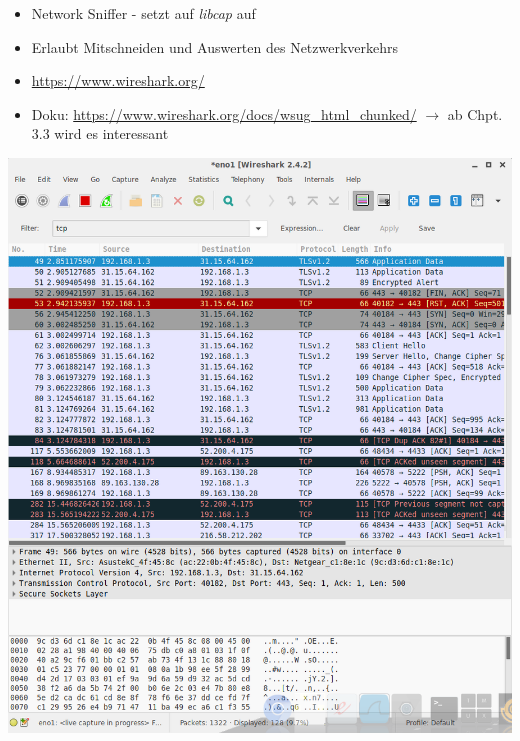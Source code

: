 \documentclass[xcolor=dvipsnames, aspectratio=169]{beamer}
\begin{document}
\begin{frame}
\hspace{-1.3cm}
\begin{minipage}{0.6\textwidth}
\begin{itemize}
	\item Network Sniffer - setzt auf \emph{libcap} auf
	\item Erlaubt Mitschneiden und Auswerten des Netzwerkverkehrs
	\item \url{https://www.wireshark.org/}
	\item Doku: \url{https://www.wireshark.org/docs/wsug_html_chunked/} $\rightarrow$ ab Chpt. 3.3 wird es interessant
\end{itemize}
\end{minipage}%
\begin{minipage}{0.4\textwidth}
\includegraphics[scale=0.2]{wireshark}
\end{minipage}
\end{frame}
\end{document}
